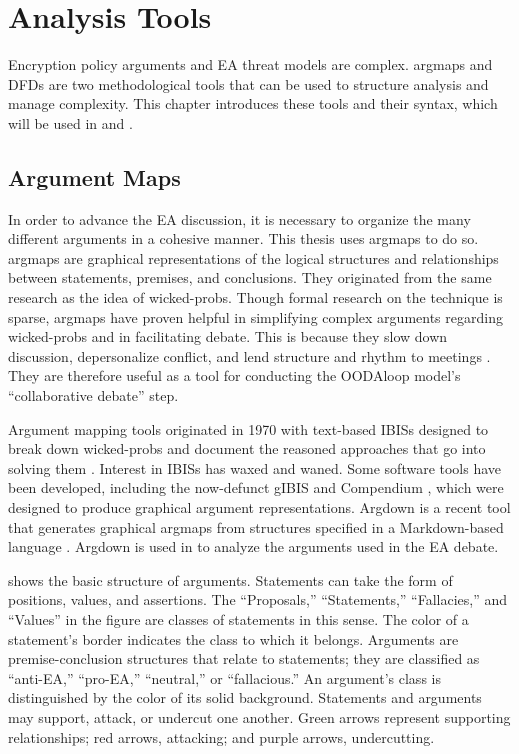 \chapter{Analysis Tools}
\label{chap-tools}

Encryption policy arguments and \acl{EA} threat models are complex. \Acp{argmap} and \aclp{DFD} are two methodological
tools that can be used to structure analysis and manage complexity. This chapter introduces these tools and their
syntax, which will be used in  and .


\section{Argument Maps}
\label{sec-arg-maps-intro}

In order to advance the \ac{EA} discussion, it is necessary to organize the many different arguments in a cohesive
manner. This thesis uses \acp{argmap} to do so. \Acp{argmap} are graphical representations of the logical structures and
relationships between statements, premises, and conclusions. They originated from the same research as the idea of
\acp{wicked-prob}. Though formal research on the technique is sparse, \acp{argmap} have proven helpful in simplifying
complex arguments regarding \acp{wicked-prob} \cite{renton_2007} and in facilitating debate. This is because they slow
down discussion, depersonalize conflict, and lend structure and rhythm to meetings \cite{dutoit_hypermedia_2006}. They
are therefore useful as a tool for conducting the \ac{OODAloop} model's ``collaborative debate'' step.

Argument mapping tools originated in 1970 with text-based \acp{IBIS} designed to break down \acp{wicked-prob} and
document the reasoned approaches that go into solving them \cite{kunz_issues_1970}. Interest in \acp{IBIS} has waxed and
waned. Some software tools have been developed, including the now-defunct gIBIS \cite{conklin_gibis_1988} and Compendium
\cite{dutoit_hypermedia_2006}, which were designed to produce graphical argument representations. Argdown is a recent
tool that generates graphical \acp{argmap} from structures specified in a Markdown-based language
\cite{voigt_argdown_2018}. Argdown is used in  to analyze the arguments used in the \ac{EA}
debate.

 shows the basic structure of arguments. Statements can take the form of positions, values, and
assertions. The ``Proposals,'' ``Statements,'' ``Fallacies,'' and ``Values'' in the figure are classes of statements in
this sense. The color of a statement's border indicates the class to which it belongs. Arguments are premise-conclusion
structures that relate to statements; they are classified as ``anti-EA,'' ``pro-EA,'' ``neutral,'' or ``fallacious.'' An
argument's class is distinguished by the color of its solid background. Statements and arguments may support, attack, or
undercut one another. Green arrows represent supporting relationships; red arrows, attacking; and purple arrows,
undercutting.


